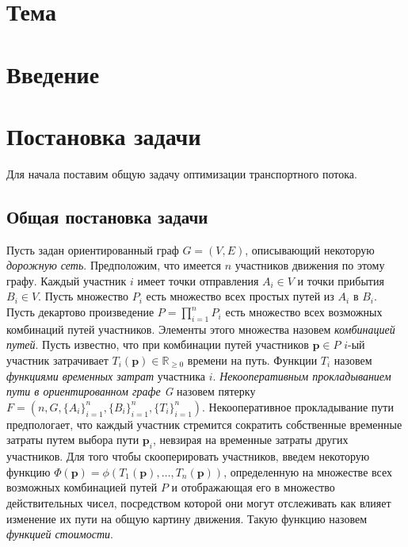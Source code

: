 \documentclass[12pt, a4paper]{article}
\begin{document}
\newpage
\pagestyle{plain}
\tableofcontents{}
\newpage	
	
 \section*{Тема}



\section{Введение}


\newpage
\section{Постановка задачи}

Для начала поставим общую задачу оптимизации транспортного потока.


\subsection{Общая постановка задачи}

Пусть задан ориентированный граф $G = (V, E)$, описывающий некоторую \textit{дорожную сеть}. Предположим, что имеется $n$ участников движения по этому графу. Каждый участник $i$ имеет точки отправления $A_i \in V$ и точки прибытия $B_i \in V$. Пусть множество $P_i$ есть множество всех простых путей из $A_i$ в $B_i$. Пусть декартово произведение ${P = \prod \limits_{i = 1} ^ n P_i}$ есть множество всех возможных комбинаций путей участников. Элементы этого множества назовем \textit{комбинацией путей}. Пусть известно, что при комбинации путей участников ${\textbf{p} \in P}$ $i$-ый участник затрачивает $T_i(\textbf{p}) \in \mathbb{R}_{\ge 0}$ времени на путь. 
Функции $T_i$ назовем \textit{функциями временных затрат} участника $i$.
\textit{Некооперативным прокладыванием пути в ориентированном графе G} назовем пятерку $F = (n, G, \{A_i\}_{i = 1}^{n}, \{B_i\}_{i = 1}^{n}, \{T_i\}_{i = 1}^{n})$. Некооперативное прокладывание пути предпологает, что каждый участник стремится сократить собственные временные затраты путем выбора пути $\textbf{p}_i$, невзирая на временные затраты других участников. 
Для того чтобы скооперировать участников, введем некоторую функцию $\Phi (\textbf{p}) = \phi (T_1 (\textbf{p}), \ldots, T_n(\textbf{p}))$, определенную на множестве всех возможных комбинацией путей $P$ и отображающая его в множество действительных чисел, посредством которой они могут отслеживать как влияет изменение их пути на общую картину движения. Такую функцию назовем \textit{функцией стоимости}.
\end{document}
